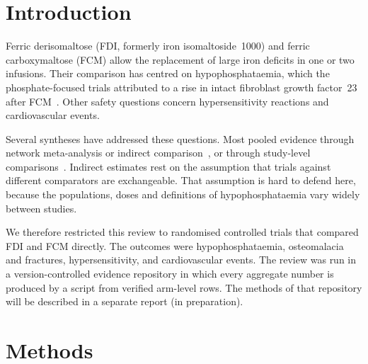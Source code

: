 \documentclass[11pt,a4paper]{article}
\begin{document}
\begin{abstract}
\noindent\textbf{Conclusions.} In head-to-head randomised trials, FDI may reduce the incidence of hypophosphataemia compared with FCM. Evidence on hypersensitivity and cardiovascular safety is very uncertain, and no head-to-head trial has reported osteomalacia or fractures.

\noindent\textbf{Registration.} The protocol was frozen in the project's version-controlled repository (commit fc19a3a) before the systematic searches and arm-level data extraction, and is publicly available; it was not registered in a review registry.
\end{abstract}

\section{Introduction}

Ferric derisomaltose (FDI, formerly iron isomaltoside~1000) and ferric carboxymaltose (FCM) allow the replacement of large iron deficits in one or two infusions. Their comparison has centred on hypophosphataemia, which the phosphate-focused trials attributed to a rise in intact fibroblast growth factor~23 after FCM~\cite{R32016310}. Other safety questions concern hypersensitivity reactions and cardiovascular events.

Several syntheses have addressed these questions. Most pooled evidence through network meta-analysis or indirect comparison~\cite{Bellos2020,Pollock2022,Divers2026,Azevedo2026}, or through study-level comparisons~\cite{Schaefer2021,Kennedy2023}. Indirect estimates rest on the assumption that trials against different comparators are exchangeable. That assumption is hard to defend here, because the populations, doses and definitions of hypophosphataemia vary widely between studies.

We therefore restricted this review to randomised controlled trials that compared FDI and FCM directly. The outcomes were hypophosphataemia, osteomalacia and fractures, hypersensitivity, and cardiovascular events. The review was run in a version-controlled evidence repository in which every aggregate number is produced by a script from verified arm-level rows. The methods of that repository will be described in a separate report (in preparation).

\section{Methods}
\end{document}
